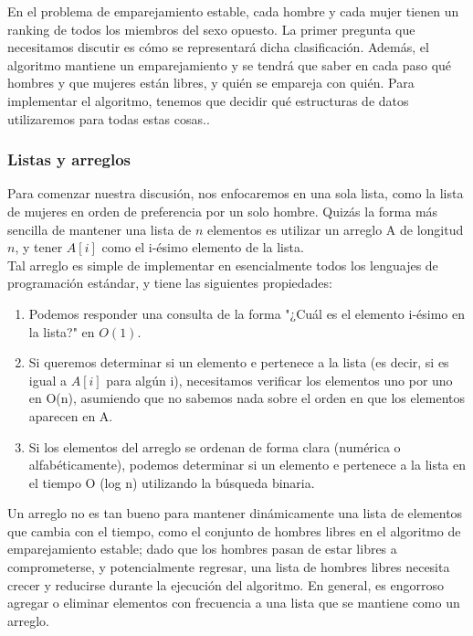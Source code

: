 \documentclass[a4paper]{article}
\begin{document}
En el problema de emparejamiento estable, cada hombre y cada mujer tienen un ranking de todos los miembros del sexo opuesto. La primer pregunta que necesitamos discutir es cómo se representará dicha clasificación. Además, el algoritmo mantiene un emparejamiento y se tendrá que saber en cada paso qué hombres y que mujeres están libres, y quién se empareja con quién. Para implementar el algoritmo, tenemos que decidir qué estructuras de datos utilizaremos para todas estas cosas..\\

\subsubsection*{Listas y arreglos}


Para comenzar nuestra discusión, nos enfocaremos en una sola lista, como la lista de mujeres en orden de preferencia por un solo hombre. Quizás la forma más sencilla de mantener una lista de $n$ elementos es utilizar un arreglo A de longitud $n$, y tener $A[i]$ como el i-ésimo elemento de la lista. \\ 

Tal arreglo es simple de implementar en esencialmente todos los lenguajes de programación estándar, y tiene las siguientes propiedades:\\

\begin{enumerate}
    \item  Podemos responder una consulta de la forma "¿Cuál es el elemento i-ésimo en la lista?" en $O(1)$.
    \item Si queremos determinar si un elemento e pertenece a la lista (es decir, si es igual a $A[i]$ para algún
i), necesitamos verificar los elementos uno por uno en O(n), asumiendo que no sabemos nada sobre
el orden en que los elementos aparecen en A.
    \item  Si los elementos del arreglo se ordenan de forma clara (numérica o alfabéticamente), podemos
determinar si un elemento e pertenece a la lista en el tiempo O (log n) utilizando la búsqueda
binaria.
   \end{enumerate}

Un arreglo no es tan bueno para mantener dinámicamente una lista de elementos que cambia con el tiempo, como el conjunto de hombres libres en el algoritmo de emparejamiento estable; dado que los hombres pasan de estar libres a comprometerse, y potencialmente regresar, una lista de hombres libres necesita crecer y reducirse durante la ejecución del algoritmo. En general, es engorroso agregar o eliminar elementos con frecuencia a una lista que se mantiene como un arreglo. \\
\end{document}
